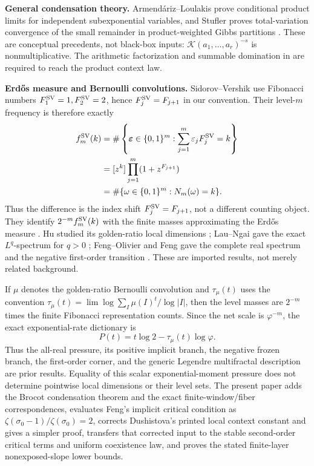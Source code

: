 \noindent\textbf{General condensation theory.}
Armend\'ariz--Loulakis prove conditional product limits for independent
subexponential variables, and Stufler proves total-variation convergence of
the small remainder in product-weighted Gibbs partitions
\cite{ArmendarizLoulakis2011,Stufler2020}.  These are conceptual precedents,
not black-box inputs: \(\mathcal K(a_1,\ldots,a_r)^{-s}\) is nonmultiplicative.
The arithmetic factorization and summable domination in
 are required to reach the product context
law.

\noindent\textbf{Erd\H{o}s measure and Bernoulli convolutions.}
Sidorov--Vershik use Fibonacci numbers
\(F^{\rm SV}_1=1,F^{\rm SV}_2=2\), hence
\(F^{\rm SV}_j=F_{j+1}\) in our convention.  Their level-\(m\) frequency is
therefore exactly
\begin{align*}
 f_m^{\rm SV}(k)
 &=\#\left\{\boldsymbol\varepsilon\in\{0,1\}^m:
   \sum_{j=1}^m\varepsilon_jF_j^{\rm SV}=k\right\}\\
 &=[z^k]\prod_{j=1}^m(1+z^{F_{j+1}})\\
 &=\#\{\omega\in\{0,1\}^m:N_m(\omega)=k\}.
\end{align*}
Thus the difference is the index shift \(F_j^{\rm SV}=F_{j+1}\), not a
different counting object.  They identify \(2^{-m}f_m^{\rm SV}(k)\) with the
finite masses approximating the Erd\H{o}s measure
\cite[Sec.~3]{SidorovVershik1998}.  Hu studied its golden-ratio local dimensions
\cite{Hu1997}; Lau--Ngai gave the exact \(L^q\)-spectrum for \(q>0\)
\cite{LauNgai1998}; Feng--Olivier and Feng gave the complete real spectrum and
the negative first-order transition \cite{FengOlivier2003,Feng2005}.  These
are imported results, not merely related background.

If \(\mu\) denotes the golden-ratio Bernoulli convolution and
\(\tau_\mu(t)\) uses the convention
\(\tau_\mu(t)=\lim \log\sum_I\mu(I)^t/\log|I|\), then the level masses are
\(2^{-m}\) times the finite Fibonacci representation counts.  Since the net
scale is \(\varphi^{-m}\), the exact exponential-rate dictionary is
\begin{equation}
 P(t)=t\log2-\tau_\mu(t)\log\varphi.
 \label{eq:erdos-pressure-dictionary}
\end{equation}
Thus the all-real pressure, its positive implicit branch, the negative frozen
branch, the first-order corner, and the generic Legendre multifractal
description are prior results.  Equality of this scalar exponential-moment
pressure does not determine pointwise local dimensions or their level sets.
The present paper adds the Brocot condensation theorem and the exact
  finite-window/fiber correspondences, evaluates Feng's implicit critical
  condition as \(\zeta(\sigma_0-1)/\zeta(\sigma_0)=2\), corrects Dushistova's
  printed local context constant and gives a simpler proof, transfers that
  corrected input to the stable second-order critical terms and uniform
  coexistence law, and proves the stated finite-layer nonexposed-slope lower
  bounds.

